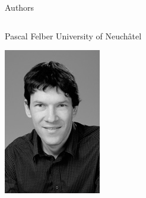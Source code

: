 \documentclass[presentation]{beamer}
\begin{document}
\begin{frame}[label={sec:org103b257}]{Authors}
\begin{block}{}
\begin{columns}
\begin{column}{0.2\columnwidth}
\begin{block}{Pascal Felber}
University of Neuchâtel\\
\begin{center}
\includegraphics[width=.9\linewidth]{./IMGs/pascal.jpg}
\end{center}
\end{block}
\end{column}


\end{columns}
\end{block}
\end{frame}
\end{document}
